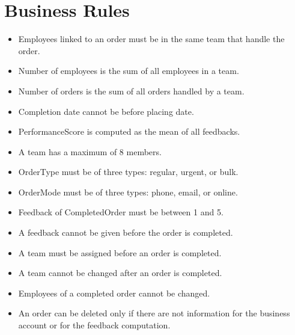 \section{Business Rules}
\begin{itemize}
    \item Employees linked to an order must be in the same team that handle the order.
    \item Number of employees is the sum of all employees in a team.
    \item Number of orders is the sum of all orders handled by a team.
    \item Completion date cannot be before placing date.
    \item PerformanceScore is computed as the mean of all feedbacks.
    \item A team has a maximum of 8 members.
    \item OrderType must be of three types: regular, urgent, or bulk.
    \item OrderMode must be of three types: phone, email, or online.
    \item Feedback of CompletedOrder must be between 1 and 5.
    \item A feedback cannot be given before the order is completed.
    \item A team must be assigned before an order is completed.
    \item A team cannot be changed after an order is completed.
    \item Employees of a completed order cannot be changed.
    \item An order can be deleted only if there are not information for the business account or for the feedback computation.
\end{itemize}

